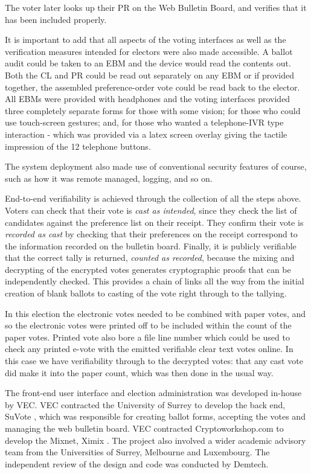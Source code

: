 \documentclass[twocolumn]{article}
\begin{document}
The voter later looks up their PR on the Web Bulletin Board, and verifies that it has been included properly.

It is important to add that all aspects of the voting interfaces as well as the verification measures intended for electors were also made accessible.  A ballot audit could be taken to an EBM and the device would read the contents out.  Both the CL and PR could be read out separately on any EBM or if provided together, the assembled preference-order vote could be read back to the elector.  All EBMs were provided with headphones and the voting interfaces provided three completely separate forms for those with some vision; for those who could use touch-screen gestures; and, for those who wanted a telephone-IVR type interaction - which was provided via a latex screen overlay giving the tactile impression of the 12 telephone buttons.

The system deployment also made use of conventional security features of course, such as how it was remote managed, logging, and so on.  

End-to-end verifiability is achieved through the collection of all the steps above.  Voters can check that their vote is {\em cast as intended}, since they check the list of candidates against the preference list on their receipt.  They confirm their vote is {\em recorded as cast} by checking that their preferences on the receipt correspond to the information recorded on the bulletin board.  Finally, it is publicly verifiable that the correct tally is returned, {\em counted as recorded}, because the mixing and decrypting of the encrypted votes generates cryptographic proofs that can be independently checked.  This provides a chain of links all the way from the initial creation of blank ballots to casting of the vote right through to the tallying.

In this election the electronic votes needed to be combined with paper votes, and so the electronic votes were printed off to be included within the count of the paper votes.  Printed vote also bore a file line number which could be used to check any printed e-vote with the emitted verifiable clear text votes online.  In this case we have verifiability through to the decrypted votes: that any cast vote did make it into the paper count, which was then done in the usual way.





The front-end user interface and election administration was developed in-house by VEC.  VEC contracted the University of Surrey to develop the back end, SuVote \cite{suvote}, which was responsible for creating ballot forms, accepting the votes and managing the web bulletin board.  VEC contracted Cryptoworkshop.com to develop the Mixnet, Ximix \cite{ximix}.  The project also involved a wider academic advisory team from the Universities of Surrey, Melbourne and Luxembourg.  The independent review of the design and code \cite{demtechreview} was conducted by Demtech.  
\end{document}
